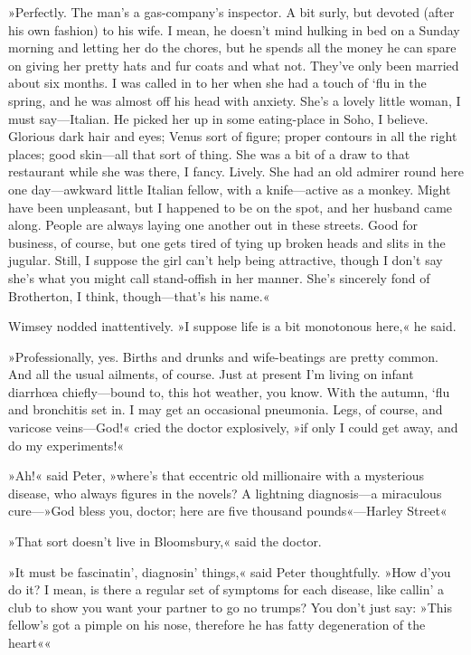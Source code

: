 »Perfectly. The man's a gas-company's inspector. A bit surly, but devoted (after his own fashion) to his wife. I mean, he doesn't mind hulking in bed on a Sunday morning and letting her do the chores, but he spends all the money he can spare on giving her pretty hats and fur coats and what not. They've only been married about six months. I was called in to her when she had a touch of `flu in the spring, and he was almost off his head with anxiety. She's a lovely little woman, I must say—Italian. He picked her up in some eating-place in Soho, I believe. Glorious dark hair and eyes; Venus sort of figure; proper contours in all the right places; good skin—all that sort of thing. She was a bit of a draw to that restaurant while she was there, I fancy. Lively. She had an old admirer round here one day—awkward little Italian fellow, with a knife—active as a monkey. Might have been unpleasant, but I happened to be on the spot, and her husband came along. People are always laying one another out in these streets. Good for business, of course, but one gets tired of tying up broken heads and slits in the jugular. Still, I suppose the girl can't help being attractive, though I don't say she's what you might call stand-offish in her manner. She's sincerely fond of Brotherton, I think, though—that's his name.«

Wimsey nodded inattentively. »I suppose life is a bit monotonous here,« he said.

»Professionally, yes. Births and drunks and wife-beatings are pretty common. And all the usual ailments, of course. Just at present I'm living on infant diarrhœa chiefly—bound to, this hot weather, you know. With the autumn, `flu and bronchitis set in. I may get an occasional pneumonia. Legs, of course, and varicose veins—God!« cried the doctor explosively, »if only I could get away, and do my experiments!«

»Ah!« said Peter, »where's that eccentric old millionaire with a mysterious disease, who always figures in the novels? A lightning diagnosis—a miraculous cure—»God bless you, doctor; here are five thousand pounds«—Harley Street\longdash«

»That sort doesn't live in Bloomsbury,« said the doctor.

»It must be fascinatin', diagnosin' things,« said Peter thoughtfully. »How d'you do it? I mean, is there a regular set of symptoms for each disease, like callin' a club to show you want your partner to go no trumps? You don't just say: »This fellow's got a pimple on his nose, therefore he has fatty degeneration of the heart\longdash««

